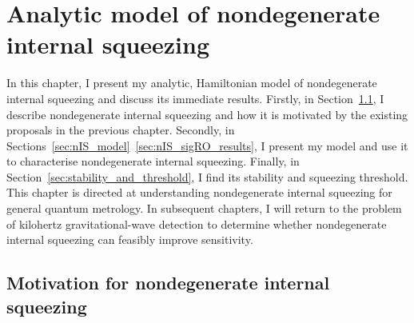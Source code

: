 \chapter{Analytic model of nondegenerate internal squeezing} %
\label{chp:nIS_analytics}




In this chapter, I present my analytic, Hamiltonian model of nondegenerate internal squeezing and discuss its immediate results.
Firstly, in Section~\ref{sec:modal_equivalence}, I describe nondegenerate internal squeezing and how it is motivated by the existing proposals in the previous chapter. Secondly, in Sections~\ref{sec:nIS_model}~\ref{sec:nIS_sigRO_results}, I present my model and use it to characterise nondegenerate internal squeezing. %
Finally, in Section~\ref{sec:stability_and_threshold}, I find its stability and squeezing threshold. %
This chapter is directed at understanding nondegenerate internal squeezing for general quantum metrology. In subsequent chapters, I will return to the problem of kilohertz gravitational-wave detection to determine whether nondegenerate internal squeezing can feasibly improve sensitivity. 


\section{Motivation for nondegenerate internal squeezing}
\label{sec:modal_equivalence}

